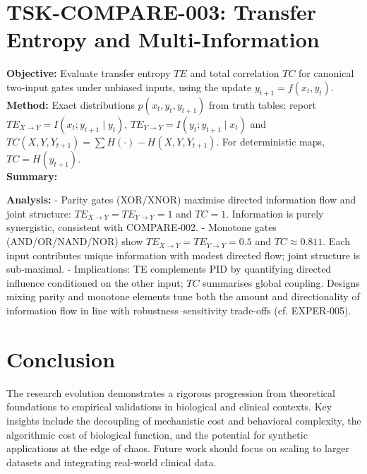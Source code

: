 \documentclass{article}
\begin{document}
\section{TSK-COMPARE-003: Transfer Entropy and Multi-Information}
\textbf{Objective:} Evaluate transfer entropy $TE$ and total correlation $TC$ for canonical two-input gates under unbiased inputs, using the update $y_{t+1}=f(x_t,y_t)$.\\
\textbf{Method:} Exact distributions $p(x_t,y_t,y_{t+1})$ from truth tables; report $TE_{X\to Y}=I(x_t;y_{t+1}\mid y_t)$, $TE_{Y\to Y}=I(y_t;y_{t+1}\mid x_t)$ and $TC(X,Y,Y_{t+1})=\sum H(\cdot)-H(X,Y,Y_{t+1})$. For deterministic maps, $TC=H(y_{t+1})$.\\
\textbf{Summary:}\\
\begin{center}
\end{center}
\textbf{Analysis:}
- Parity gates (XOR/XNOR) maximise directed information flow and joint structure: $TE_{X\to Y}=TE_{Y\to Y}=1$ and $TC=1$. Information is purely synergistic, consistent with COMPARE‑002.
- Monotone gates (AND/OR/NAND/NOR) show $TE_{X\to Y}=TE_{Y\to Y}=0.5$ and $TC\approx0.811$. Each input contributes unique information with modest directed flow; joint structure is sub‑maximal.
- Implications: TE complements PID by quantifying directed influence conditioned on the other input; $TC$ summarises global coupling. Designs mixing parity and monotone elements tune both the amount and directionality of information flow in line with robustness–sensitivity trade‑offs (cf. EXPER‑005).




\section{Conclusion}
The research evolution demonstrates a rigorous progression from theoretical foundations to empirical validations in biological and clinical contexts. Key insights include the decoupling of mechanistic cost and behavioral complexity, the algorithmic cost of biological function, and the potential for synthetic applications at the edge of chaos. Future work should focus on scaling to larger datasets and integrating real-world clinical data.



\end{document}

